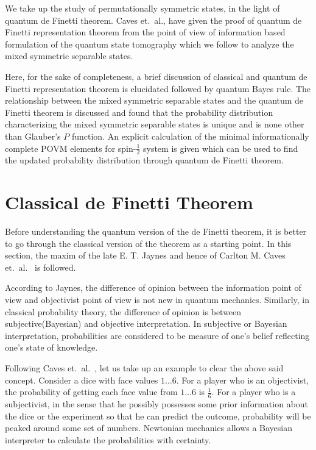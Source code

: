 We take up the study of permutationally symmetric states, in the light of quantum de Finetti theorem. Caves \cite{chap27-key8} et.\ al., have given the proof of quantum de Finetti representation theorem from the point of view of information based formulation of the quantum state tomography which we follow to analyze the mixed symmetric separable states. 

Here, for the sake of completeness, a brief discussion of classical and quantum de Finetti representation theorem is elucidated followed by quantum Bayes rule. The relationship between the mixed symmetric separable states and the quantum de Finetti theorem is discussed and found that the probability distribution characterizing the mixed symmetric separable states is unique and is none other than Glauber's $P$ function. An explicit calculation of the minimal informationally complete POVM elements for spin-$\frac{1}{2}$ system is given which can be used to find the updated probability distribution through quantum de Finetti theorem.

\section{Classical de Finetti Theorem}\label{chap27-sec2}

Before understanding the quantum version of the de Finetti theorem, it is better to go through the classical version of the theorem as a starting point. In this section, the maxim of the late E. T. Jaynes \cite{chap27-key9} and hence of Carlton M. Caves et.\ al.\ \cite{chap27-key8} is followed.

According to Jaynes, the difference of opinion between the information point of view and objectivist point of view is not new in quantum mechanics. Similarly, in classical probability theory, the difference of opinion is between subjective(Bayesian) and objective interpretation. In subjective or Bayesian interpretation, probabilities are considered to be measure of one's belief reflecting one's state of knowledge.

Following Caves et.\ al.\ \cite{chap27-key8}, let us take up an example to clear the above said concept. Consider a dice with face values $1 \ldots 6$. For a player who is an objectivist, the probability of getting each face value from $1 \ldots 6$ is $\frac{1}{6}$. For a player who is a subjectivist, in the sense that he possibly possesses some prior information about the dice or the experiment so that he can predict the outcome, probability will be peaked around some set of numbers. Newtonian mechanics allows a Bayesian interpreter to calculate the probabilities with certainty.

